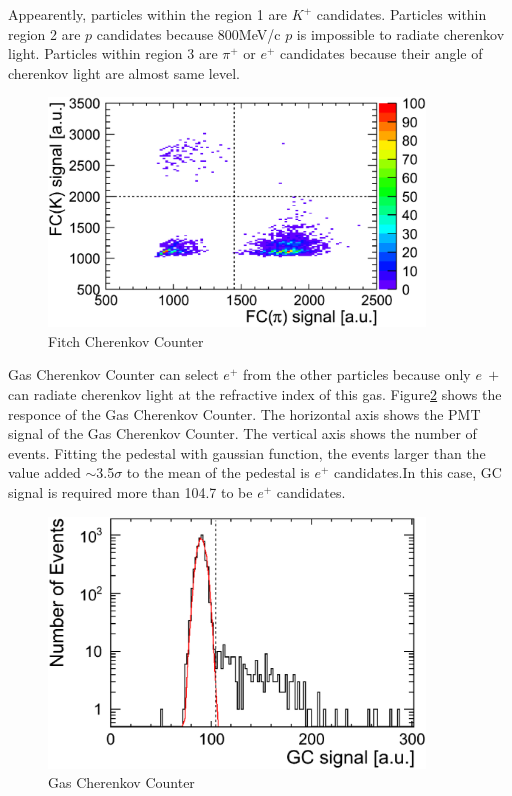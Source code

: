 Appearently, particles within the region 1 are $K^{+}$ candidates.
Particles within region 2 are $p$ candidates because 800MeV/c $p$ is impossible to radiate cherenkov light.
Particles within region 3 are $\pi^{+}$ or $e^{+}$ candidates because their angle of cherenkov light are almost same level.\\

\begin{figure}[htbp]
  \centering
  \includegraphics[width=10cm,clip]{fig/FC_KPI.eps}
  \caption{Fitch Cherenkov Counter}
  \label{fig:FC_KPI}
\end{figure}

Gas Cherenkov Counter can select $e^{+}$ from the other particles because only $e~{+}$ can radiate cherenkov light at the refractive index of this gas.
Figure\ref{fig:GC} shows the responce of the Gas Cherenkov Counter.
The horizontal axis shows the PMT signal of the Gas Cherenkov Counter.
The vertical axis shows the number of events.
Fitting the pedestal with gaussian function,
the events larger than the value added $\sim$3.5$\sigma$ to the mean of the pedestal is $e^{+}$ candidates.In this case, GC signal is required more than 104.7 to be $e^{+}$ candidates.\\

\begin{figure}[htbp]
  \centering
  \includegraphics[width=10cm,clip]{fig/GC.eps}
  \caption{Gas Cherenkov Counter}
  \label{fig:GC}
\end{figure}


